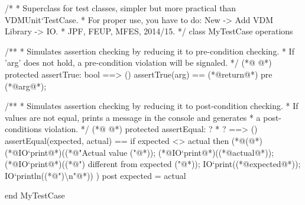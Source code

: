 \begin{vdmpp}[breaklines=true]
/*
 * Superclass for test classes, simpler but more practical than VDMUnit`TestCase.
 * For proper use, you have to do: New -> Add VDM Library -> IO.
 * JPF, FEUP, MFES, 2014/15.
 */
class MyTestCase
operations

  /**
   * Simulates assertion checking by reducing it to pre-condition checking.
   * If 'arg' does not hold, a pre-condition violation will be signaled.
   */
(*@
\label{assertTrue:13}
@*)
  protected assertTrue: bool ==> ()
  assertTrue(arg) ==
    (*@return@*)
  pre (*@arg@*);

  /**
   * Simulates assertion checking by reducing it to post-condition checking.
   * If values are not equal, prints a message in the console and generates
   * a post-conditions violation.
   */
(*@
\label{assertEqual:23}
@*)
  protected assertEqual: ? * ? ==> ()
  assertEqual(expected, actual) ==
    if expected <> actual then (*@(@*)
      (*@IO`print@*)((*@"Actual value ("@*));
      (*@IO`print@*)((*@actual@*));
      (*@IO`print@*)((*@") different from expected ("@*));
      IO`print((*@expected@*));
      IO`println((*@")\textbackslash n"@*))
    )
  post expected = actual

end MyTestCase
\end{vdmpp}


